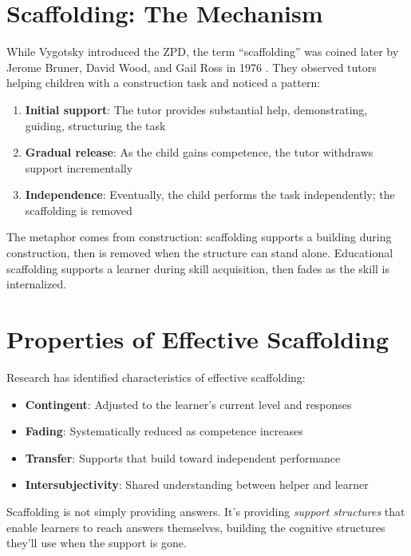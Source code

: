 \section{Scaffolding: The Mechanism}

While Vygotsky introduced the ZPD, the term ``scaffolding'' was coined later by Jerome Bruner, David Wood, and Gail Ross in 1976 \cite{bruner1976role}. They observed tutors helping children with a construction task and noticed a pattern:

\begin{enumerate}
    \item \textbf{Initial support}: The tutor provides substantial help, demonstrating, guiding, structuring the task
    \item \textbf{Gradual release}: As the child gains competence, the tutor withdraws support incrementally
    \item \textbf{Independence}: Eventually, the child performs the task independently; the scaffolding is removed
\end{enumerate}

The metaphor comes from construction: scaffolding supports a building during construction, then is removed when the structure can stand alone. Educational scaffolding supports a learner during skill acquisition, then fades as the skill is internalized.

\section{Properties of Effective Scaffolding}

Research has identified characteristics of effective scaffolding:

\begin{itemize}
    \item \textbf{Contingent}: Adjusted to the learner's current level and responses
    \item \textbf{Fading}: Systematically reduced as competence increases
    \item \textbf{Transfer}: Supports that build toward independent performance
    \item \textbf{Intersubjectivity}: Shared understanding between helper and learner
\end{itemize}

Scaffolding is not simply providing answers. It's providing \emph{support structures} that enable learners to reach answers themselves, building the cognitive structures they'll use when the support is gone.

